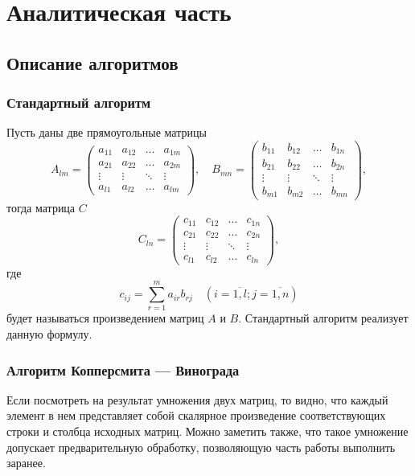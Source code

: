 \chapter{Аналитическая часть}

\section{Описание алгоритмов}

\subsection{Стандартный алгоритм}

Пусть даны две прямоугольные матрицы
\[A_{lm} = 
\begin{pmatrix}
	a_{11} & a_{12} & \ldots & a_{1m}\\
	a_{21} & a_{22} & \ldots & a_{2m}\\
	\vdots & \vdots & \ddots & \vdots\\
	a_{l1} & a_{l2} & \ldots & a_{lm}
\end{pmatrix},\quad  
B_{mn} = 
\begin{pmatrix}
	b_{11} & b_{12} & \ldots & b_{1n}\\
	b_{21} & b_{22} & \ldots & b_{2n}\\
	\vdots & \vdots & \ddots & \vdots\\
	b_{m1} & b_{m2} & \ldots & b_{mn}
\end{pmatrix},
\]
тогда матрица $C$
\[C_{ln} = 
\begin{pmatrix}
	c_{11} & c_{12} & \ldots & c_{1n}\\
	c_{21} & c_{22} & \ldots & c_{2n}\\
	\vdots & \vdots & \ddots & \vdots\\
	c_{l1} & c_{l2} & \ldots & c_{ln}
\end{pmatrix},
\]
где
\begin{equation}
\label{eq:M}
c_{ij} = 
\sum_{r=1}^{m} a_{ir}b_{rj} \quad (i=\overline{1,l}; j=\overline{1,n})
\end{equation}
будет называться произведением матриц $A$ и $B$.
Стандартный алгоритм реализует данную формулу.

\subsection{Алгоритм Копперсмита — Винограда}

Если посмотреть на результат умножения двух матриц, то видно, что каждый элемент в нем представляет собой скалярное произведение соответствующих строки и столбца исходных матриц. Можно заметить также, что такое умножение допускает предварительную обработку, позволяющую часть работы выполнить заранее.

